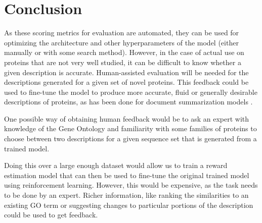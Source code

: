 \documentclass{specification}
\begin{document}
\section{Conclusion}

As these scoring metrics for evaluation are automated, they can be used for optimizing the architecture and other hyperparameters of the model (either manually or with some search method). However, in the case of actual use on proteins that are not very well studied, it can be difficult to know whether a given description is accurate. Human-assisted evaluation will be needed for the descriptions generated for a given set of novel proteins. This feedback could be used to fine-tune the model to produce more accurate, fluid or generally desirable descriptions of proteins, as has been done for document summarization models \cite{finetuningWithHuman, learningToSummarize}.

One possible way of obtaining human feedback would be to ask an expert with knowledge of the Gene Ontology and familiarity with some families of proteins to choose between two descriptions for a given sequence set that is generated from a trained model.

Doing this over a large enough dataset would allow us to train a reward estimation model that can then be used to fine-tune the original trained model using reinforcement learning. However, this would be expensive, as the task needs to be done by an expert. Richer information, like ranking the similarities to an existing GO term or suggesting changes to particular portions of the description could be used to get feedback.



\printbibliography
\end{document}
